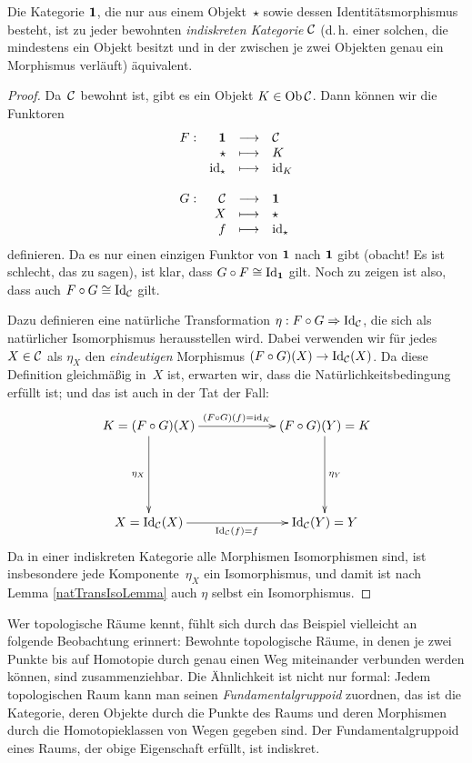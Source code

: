 \begin{bsp}
Die Kategorie $\mathbf{1}$, die nur aus einem Objekt~$\star$ sowie dessen
Iden\-ti\-täts\-mor\-phis\-mus besteht, ist zu jeder bewohnten
\emph{indiskreten Kategorie} $\mathcal{C}$ (d.\,h. einer solchen, die mindestens ein
Objekt besitzt und in der zwischen je zwei Objekten genau ein Morphismus
verläuft) äquivalent. 
\end{bsp}
\begin{proof}
Da~$\mathcal{C}$ bewohnt ist, gibt es ein Objekt $K \in \operatorname{Ob} \mathcal{C}$. Dann können wir die Funktoren
\[ \begin{array}{@{}rrcl@{}}
  F: & \Eins &\longrightarrow& \C \\
  & \star &\longmapsto& K \\
  & \id_\star &\longmapsto& \id_K \\\\
  G: & \C &\longrightarrow& \Eins \\
  & X &\longmapsto& \star \\
  & f &\longmapsto& \id_\star
\end{array} \]
definieren.
Da es nur einen einzigen Funktor von $\mathbf{1}$ nach $\mathbf{1}$ gibt (obacht! Es ist schlecht, das zu sagen), ist klar, dass $G \circ F \cong \mathrm{Id}_{\mathbf{1}}$ gilt. Noch zu zeigen ist also, dass auch $F \circ G \cong \mathrm{Id}_{\mathcal{C}}$ gilt.

Dazu definieren eine natürliche Transformation $\eta: F \circ G \Rightarrow
\mathrm{Id}_{\mathcal{C}}$, die sich als natürlicher Isomorphismus herausstellen wird. Dabei
verwenden wir für jedes $X \in \mathcal{C}$ als $\eta_X$ den \emph{eindeutigen}
Morphismus $(F\circ G) (X) \to \mathrm{Id}_{\mathcal{C}}(X)$. Da diese Definition gleichmäßig
in~$X$ ist, erwarten wir, dass die Natürlichkeitsbedingung erfüllt ist; und das
ist auch in der Tat der Fall:
\[ \xymatrixcolsep{5pc}\xymatrixrowsep{5pc}\xymatrix{
  K = (F \circ G)(X) \ar[r]^{(F \circ G)(f)=\id_K} \ar[d]_{\eta_X} & (F \circ G)(Y) = K \ar[d]^{\eta_Y} \\
  X = \Id_\C (X) \ar[r]_{\Id_\C(f)=f} & \Id_\C (Y) = Y
} \]
Da in einer indiskreten Kategorie alle Morphismen Isomorphismen sind, ist
insbesondere jede Komponente~$\eta_X$ ein Isomorphismus, und damit ist nach
Lemma \ref{natTransIsoLemma} auch $\eta$ selbst ein Isomorphismus.
\end{proof}

\begin{bem}Wer topologische Räume kennt, fühlt sich durch das Beispiel
vielleicht an folgende Beobachtung erinnert: Bewohnte topologische Räume, in
denen je zwei Punkte bis auf Homotopie durch genau einen Weg miteinander
verbunden werden können, sind zusammenziehbar. Die Ähnlichkeit ist nicht nur
formal: Jedem topologischen Raum kann man seinen \emph{Fundamentalgruppoid}
zuordnen, das ist die Kategorie, deren Objekte durch die Punkte des Raums und
deren Morphismen durch die Homotopieklassen von Wegen gegeben sind. Der
Fundamentalgruppoid eines Raums, der obige Eigenschaft erfüllt, ist
indiskret.\end{bem}


